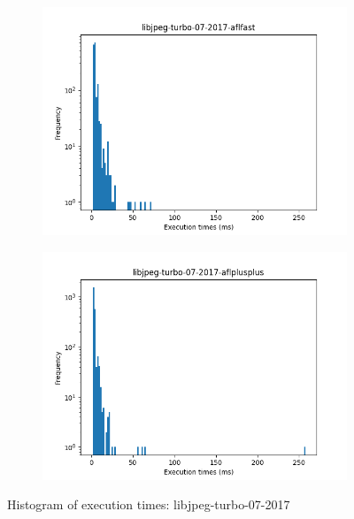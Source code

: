 \begin{figure}
    \begin{subfigure}[t]{0.475\textwidth}
        \centering
        \includegraphics[width=\textwidth]{Experiments/execs/libjpeg-turbo-07-2017-aflfast.png}
        \caption{}
        \label{fig:sub:libjpeg-hist-aflfast}
    \end{subfigure}
    \hfill
    \begin{subfigure}[t]{0.475\textwidth}
        \centering
        \includegraphics[width=\textwidth]{Experiments/execs/libjpeg-turbo-07-2017-aflplusplus.png}
        \caption{}
        \label{fig:sub:libjpeg-hist-aflplusplus}
    \end{subfigure}

    \caption{Histogram of execution times: libjpeg-turbo-07-2017}
    \label{fig:exe-libjpeg}
\end{figure}

